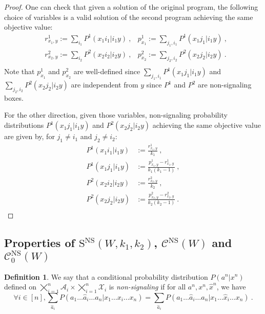 \documentclass[11pt]{article}
\theoremstyle{definition}
\newtheorem{defi}[theo]{Definition}
\theoremstyle{remark}
\begin{document}
\begin{proof}
  One can check that given a solution of the original program, the following choice of variables is a valid solution of the second program achieving the same objective value:
\begin{equation}
  \begin{aligned}
    &r^1_{x_1,y} := \sum_{i_1} P^1(x_1i_1|i_1y) \ , &p^1_{x_1} := \sum_{j_1,i_1} P^1(x_1j_1|i_1y) \ ,\\
    &r^2_{x_2,y} := \sum_{i_2} P^2(x_2i_2|i_2y) \ , &p^2_{x_2} := \sum_{j_2,i_2} P^2(x_2j_2|i_2y) \ .\\
  \end{aligned}
\end{equation}
Note that $p^1_{x_1}$ and $p^2_{x_2}$ are well-defined since  $\sum_{j_1,i_1} P^1(x_1j_1|i_1y)$ and $\sum_{j_2,i_2} P^2(x_2j_2|i_2y)$ are independent from $y$ since $P^1$ and $P^2$ are non-signaling boxes.

For the other direction, given those variables, non-signaling probability distributions $P^1(x_1j_1|i_1y)$ and $P^2(x_2j_2|i_2y)$ achieving the same objective value are given by, for $j_1 \not=i_1$ and $j_2 \not= i_2$:
\begin{equation}
  \begin{aligned}
    P^1(x_1i_1|i_1y) &:= \frac{r^1_{x_1,y}}{k_1} \ ,\\
    P^1(x_1j_1|i_1y) &:= \frac{p^1_{x_1,y} - r^1_{x_1,y}}{k_1(k_1-1)} \ ,\\
    P^2(x_2i_2|i_2y) &:= \frac{r^2_{x_2,y}}{k_2} \ ,\\
    P^2(x_2j_2|i_2y) &:= \frac{p^2_{x_2,y} - r^2_{x_2,y}}{k_2(k_2-1)} \ .\\
  \end{aligned}
\end{equation}
\end{proof}

\subsection{Properties of $\mathrm{S}^{\mathrm{NS}}(W,k_1,k_2)$, $\mathcal{C}^{\mathrm{NS}}(W)$ and $\mathcal{C}^{\mathrm{NS}}_0(W)$}
\begin{defi}
  We say that a conditional probability distribution $P(a^n|x^n)$ defined on $\bigtimes_{i=1}^n\mathcal{A}_i \times \bigtimes_{i=1}^n \mathcal{X}_i$ is \emph{non-signaling} if for all $a^n, x^n, \hat{x}^n$, we have
    \[ \forall i \in [n], \sum_{\hat{a}_i}P(a_1\ldots \hat{a}_i \ldots a_n|x_1\ldots x_i \ldots x_n) = \sum_{\hat{a}_i}P(a_1\ldots \hat{a}_i \ldots a_n|x_1\ldots \hat{x}_i \ldots x_n) \ .\]
\end{defi}
\end{document}

